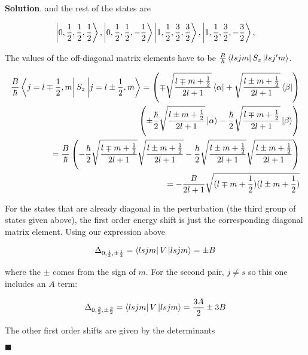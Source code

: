\documentclass[12pt]{article}
\theoremstyle{definition}
\newenvironment{s}{%
        \begin{trivlist} \item \textbf{Solution}. }{%
            \hspace*{\fill} $\blacksquare$\end{trivlist}}%
\begin{document}
{\begin{s}
and the rest of the states are

\begin{align*}
\ket{0, \frac{1}{2}, \frac{1}{2}, \frac{1}{2}},
\ket{0, \frac{1}{2}, \frac{1}{2}, -\frac{1}{2}}
\ket{1, \frac{1}{2}, \frac{3}{2}, \frac{3}{2}},
\ket{1, \frac{1}{2}, \frac{3}{2}, -\frac{3}{2}},
\end{align*}

The values of the off-diagonal matrix elements have to be $\frac{B}{\hbar}\bra{lsjm}S_z\ket{lsj'm}$.

\begin{align*}
\frac{B}{\hbar}\bra{j=l\mp \frac{1}{2},m}S_z\ket{j=l\pm \frac{1}{2},m} = \left(\mp\sqrt{\frac{l\mp m +\frac{1}{2}}{2l+1}}\bra{\alpha} 
+ \sqrt{\frac{l\pm m +\frac{1}{2}}{2l+1}}\bra{\beta}\right)\\
\left(\pm\frac{\hbar}{2}\sqrt{\frac{l\pm m +\frac{1}{2}}{2l+1}}\ket{\alpha} 
- \frac{\hbar}{2}\sqrt{\frac{l\mp m +\frac{1}{2}}{2l+1}}\ket{\beta}\right)\\
= \frac{B}{\hbar}\left(-\frac{\hbar}{2}\sqrt{\frac{l\mp m +\frac{1}{2}}{2l+1}}\sqrt{\frac{l\pm m +\frac{1}{2}}{2l+1}} - \frac{\hbar}{2}\sqrt{\frac{l\pm m +\frac{1}{2}}{2l+1}}\sqrt{\frac{l\pm m +\frac{1}{2}}{2l+1}}\right)\\
= -\frac{B}{2l+1}\sqrt{(l\mp m +\frac{1}{2})(l\pm m +\frac{1}{2})}
\end{align*} 

For the states that are already diagonal in the perturbation (the third group of states given above), the first order energy shift is just the corresponding diagonal matrix element. Using our expression above 

\begin{align*}
\Delta_{0,\frac{1}{2},\pm\frac{1}{2}} = \bra{lsjm}V\ket{lsjm} = \pm B
\end{align*}

where the $\pm$ comes from the sign of $m$. For the second pair, $j\neq s$ so this one includes an $A$ term:

\begin{align*}
\Delta_{0,\frac{3}{2},\pm\frac{3}{2}} = \bra{lsjm}V\ket{lsjm} = \frac{3A}{2} \pm 3B
\end{align*}

The other first order shifts are given by the determinants 

\end{s}
\end{document}

